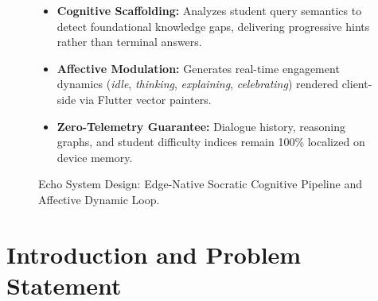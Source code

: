\documentclass[10.5pt,a4paper]{article}
\begin{document}
\begin{figure}[h!]
\begin{tcolorbox}[
  colback=lightGrayBg,
  colframe=primaryTeal!80!darkCharcoal,
  arc=4pt,
  boxrule=0.8pt,
  left=8pt, right=8pt, top=6pt, bottom=6pt,
  width=\linewidth
]
\begin{minipage}[c]{0.60\linewidth}
  \begin{itemize}[leftmargin=*,itemsep=1.5pt,topsep=0pt,parsep=0pt]
    \item \scriptsize\textbf{\color{primaryTeal}Cognitive Scaffolding:} Analyzes student query semantics to detect foundational knowledge gaps, delivering progressive hints rather than terminal answers.
    \item \scriptsize\textbf{\color{primaryTeal}Affective Modulation:} Generates real-time engagement dynamics (\textit{idle}, \textit{thinking}, \textit{explaining}, \textit{celebrating}) rendered client-side via Flutter vector painters.
    \item \scriptsize\textbf{\color{primaryTeal}Zero-Telemetry Guarantee:} Dialogue history, reasoning graphs, and student difficulty indices remain 100\% localized on device memory.
  \end{itemize}
\end{minipage}
\end{tcolorbox}
\vspace{-0.25cm}
\caption{Echo System Design: Edge-Native Socratic Cognitive Pipeline and Affective Dynamic Loop.}
\label{fig:echo_framework}
\end{figure}

\vspace{-0.3cm}

\section{Introduction and Problem Statement}
\end{document}
